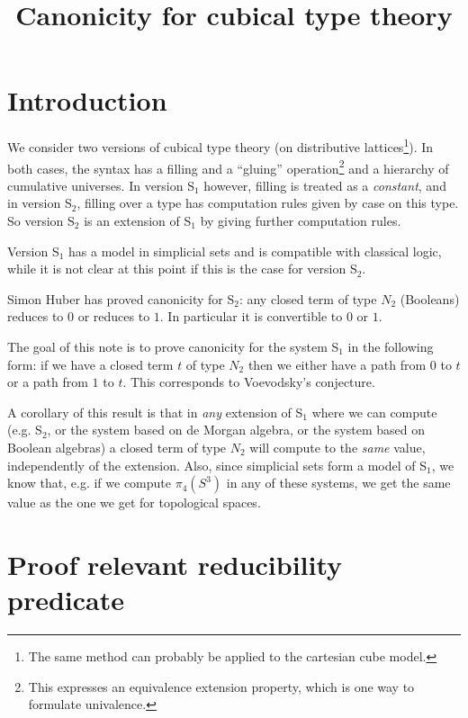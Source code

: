 \documentclass[10pt,a4paper]{article}
\begin{document}
\title{Canonicity for cubical type theory}

\author{}
\date{}
\maketitle


\section*{Introduction}

 We consider two versions of cubical type theory (on distributive lattices\footnote{The same method
can probably be applied to the cartesian cube model.}).
In both cases, the syntax has a filling and a ``gluing'' operation\footnote{This expresses
an equivalence extension property, which is one way to formulate univalence.}
and a hierarchy of cumulative universes.
In version S$_1$ however, filling is treated as a {\em constant}, and
in version S$_2$, filling over a type  has computation rules given by case on this 
type.  So version S$_2$ is an extension of S$_1$ by giving further computation rules.

 Version S$_1$ has a model in simplicial sets and is compatible with classical logic,
while it is not clear at this point if this is the case for version S$_2$.

\medskip

 Simon Huber has proved canonicity for S$_2$: any closed
term of type $N_2$ (Booleans) reduces to $0$ or reduces to $1$. In particular
it is convertible to $0$ or $1$.

\medskip

 The goal of this note is to prove canonicity for the system S$_1$ in the following form: if we have a closed
term $t$ of type $N_2$ then we either have a path from $0$ to $t$ or a path from $1$
to $t$. This corresponds to Voevodsky's conjecture. 

 A corollary of this result is that
in {\em any} extension of S$_1$ where we can compute (e.g. S$_2$, or the system based
on de Morgan algebra, or the system based on Boolean algebras)
a closed term of type $N_2$ will compute to the {\em same} value, independently of the extension. 
Also, since simplicial sets
form a model of S$_1$, we know that, e.g. if we compute $\pi_4(S^3)$ in any of these systems, we get
the same value as the one we get for topological spaces.

\section{Proof relevant reducibility predicate}
\end{document}
